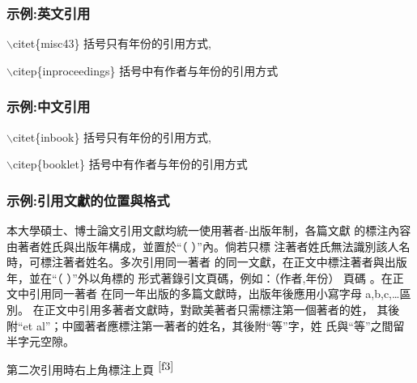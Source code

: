 \subsubsection{示例:英文引用}
$\backslash$citet\{misc43\} 括号只有年份的引用方式,\citet{misc43}\label{misc43}

$\backslash$citep\{inproceedings\} 括号中有作者与年份的引用方式\citep{inproceedings}

\subsubsection{示例:中文引用}
$\backslash$citet\{inbook\} 括号只有年份的引用方式,\citet{inbook}\label{inbook}

$\backslash$citep\{booklet\} 括号中有作者与年份的引用方式\citep{booklet}


\clearpage
\subsubsection{示例:引用文獻的位置與格式}
\par 本大學碩士、博士論文引用文獻均統一使用著者-出版年制，各篇文獻
的標注內容由著者姓氏與出版年構成，並置於“（ ）”內。倘若只標
注著者姓氏無法識別該人名時，可標注著者姓名。多次引用同一著者
的同一文獻，在正文中標注著者與出版年，並在“（ ）”外以角標的
形式著錄引文頁碼，例如：（作者,年份）
頁碼 。在正文中引用同一著者
在同一年出版的多篇文獻時，出版年後應用小寫字母 a,b,c,…區別。
在正文中引用多著者文獻時，對歐美著者只需標注第一個著者的姓，
其後附“et al”；中國著者應標注第一著者的姓名，其後附“等”字，姓
氏與“等”之間留半字元空隙。

第二次引用時右上角標注上頁 \citet{f3}$^{\pageref{f3}}$

